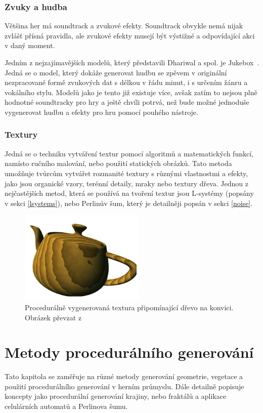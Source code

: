 \subsection{Zvuky a hudba}
Většina her má soundtrack a zvukové efekty. Soundtrack obvykle nemá nijak zvlášť přísná pravidla, ale zvukové efekty musejí být výstižné a odpovídající akci v daný moment. 

Jedním z nejzajímavějších modelů, který představili Dhariwal a spol. je Jukebox~\cite{Dhariwal2020JukeboxAG}. Jedná se o model, který dokáže generovat hudbu se zpěvem v originální nezpracované formě zvukových dat s délkou v řádu minut, i s určením žánru a vokálního stylu. Modelů jako je tento již existuje více, avšak zatím to nejsou plně hodnotné soundtracky pro hry a ještě chvíli potrvá, než bude možné jednoduše vygenerovat hudbu a efekty pro hru pomocí pouhého nástroje.

\newpage

\subsection{Textury}
Jedná se o techniku vytváření textur pomocí algoritmů a matematických funkcí, namísto ručního malování, nebo použití statických obrázků. Tato metoda umožňuje tvůrcům vytvářet rozmanité textury s různými vlastnostmi a efekty, jako jsou organické vzory, terénní detaily, mraky nebo textury dřeva. Jednou z nejčastějších metod, která se používá na tvoření textur jsou L-systémy (popsány v sekci \ref{lsystems}), nebo Perlinův šum, který je detailněji popsán v sekci \ref{noise}.

\begin{figure}[H]
	\centering
	\includegraphics[scale=1]{obrazky-figures/ProceduralTexture.png}
	\caption{Procedurálně vygenerovaná textura připomínající dřevo na konvici. Obrázek převzat z \cite{ola05}}
	\label{proceduralTexture}
\end{figure}

\newpage

\chapter{Metody procedurálního generování}
\label{procedural}
Tato kapitola se zaměřuje na různé metody generování geometrie, vegetace a použití procedurálního generování v herním průmyslu. Dále detailně popisuje koncepty jako procedurální generování krajiny, nebo fraktálů a aplikace celulárních automatů a Perlinova šumu.

